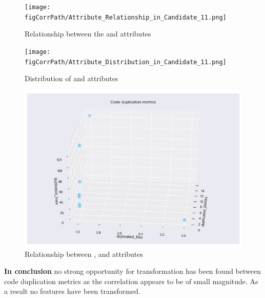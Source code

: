 \begin{figure}[!h]
     \centering
  \texttt{[image: \\figCorrPath/Attribute\_Relationship\_in\_Candidate\_11.png]}
    \caption{Relationship between the \duplicatedBlocks{} and \duplicatedFiles{} attributes}
    \label{fig:candidate11-relationship}
\end{figure}

\begin{figure}[!h]
    \centering
   \texttt{[image: \\figCorrPath/Attribute\_Distribution\_in\_Candidate\_11.png]}
    \caption{Distribution of \duplicatedBlocks{} and \duplicatedFiles{} attributes}
    \label{fig:candidate11-attrib-distribution}
\end{figure}

\begin{figure}
    \centering
    \includegraphics[scale=0.6]{Figures/three-d/Code-duplication.png}
    \caption{Relationship between \duplicatedFiles{}, \duplicatedLines{} and \duplicatedBlocks{} attributes}
    \label{fig:3d:dupFiles-dupLines-dupBlocks}
\end{figure}

\textbf{In conclusion} no strong opportunity for transformation has been found between code duplication metrics as the correlation appears to be of small magnitude. As a result no features have been transformed.
\FloatBarrier
